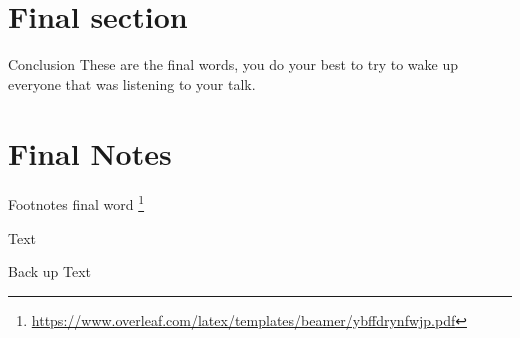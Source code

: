 \documentclass[14pt,xcolor=svgnames]{beamer} %
\begin{document}
\section{Final section}


\begin{frame}{Conclusion}
These are the final words, you do your best to try to wake up everyone that was listening to your talk.
\end{frame}

\section{Final Notes}


\begin{frame}{Footnotes}
 final word \footnote{\href{overleaf}{https://www.overleaf.com/latex/templates/beamer/ybffdrynfwjp.pdf}}
\end{frame}
\begin{frame}[standout]
Text
\end{frame}

\appendix

\begin{frame}{Back up}
Text
\end{frame}
\end{document}
